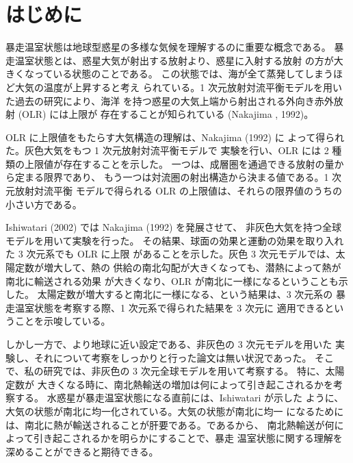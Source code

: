 \documentclass[body]{subfiles}
\begin{document}
\chapter{はじめに}
暴走温室状態は地球型惑星の多様な気候を理解するのに重要な概念である。
暴走温室状態とは、惑星大気が射出する放射より、惑星に入射する放射
の方が大きくなっている状態のことである。
この状態では、海が全て蒸発してしまうほど大気の温度が上昇すると考え
られている。1 次元放射対流平衡モデルを用いた過去の研究により、海洋
を持つ惑星の大気上端から射出される外向き赤外放射 (OLR) には上限が
存在することが知られている (Nakajima \etal*, 1992)。

OLR に上限値をもたらす大気構造の理解は、Nakajima \etal (1992) に
よって得られた。灰色大気をもつ 1 次元放射対流平衡モデルで
実験を行い、OLR には 2 種類の上限値が存在することを示した。
一つは、成層圏を通過できる放射の量から定まる限界であり、
もう一つは対流圏の射出構造から決まる値である。1 次元放射対流平衡
モデルで得られる OLR の上限値は、それらの限界値のうちの小さい方である。

Ishiwatari \etal (2002) では Nakajima \etal (1992) を発展させて、
非灰色大気を持つ全球モデルを用いて実験を行った。
その結果、球面の効果と運動の効果を取り入れた 3 次元系でも OLR に上限
があることを示した。灰色 3 次元モデルでは、太陽定数が増大して、熱の
供給の南北勾配が大きくなっても、潜熱によって熱が南北に輸送される効果
が大きくなり、OLR が南北に一様になるということも示した。
太陽定数が増大すると南北に一様になる、という結果は、3 次元系の
暴走温室状態を考察する際、1 次元系で得られた結果を 3 次元に
適用できるということを示唆している。

しかし一方で、より地球に近い設定である、非灰色の 3 次元モデルを用いた
実験し、それについて考察をしっかりと行った論文は無い状況であった。
そこで、私の研究では、非灰色の 3 次元全球モデルを用いて考察する。
特に、太陽定数が
大きくなる時に、南北熱輸送の増加は何によって引き起こされるかを考察する。
水惑星が暴走温室状態になる直前には、Ishiwatari  が示した
ように、大気の状態が南北に均一化されている。大気の状態が南北に均一
になるためには、南北に熱が輸送されることが肝要である。であるから、
南北熱輸送が何によって引き起こされるかを明らかにすることで、暴走
温室状態に関する理解を深めることができると期待できる。
\end{document}
